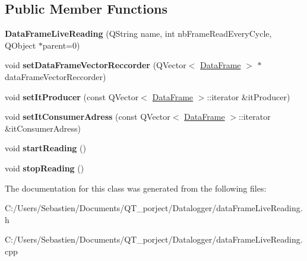 \subsection*{Public Member Functions}
\begin{DoxyCompactItemize}
\item 
\mbox{\label{class_data_frame_live_reading_a664559fc3ce08383f1d2ee146768c6a1}} 
{\bfseries Data\+Frame\+Live\+Reading} (Q\+String name, int nb\+Frame\+Read\+Every\+Cycle, Q\+Object $\ast$parent=0)
\item 
\mbox{\label{class_data_frame_live_reading_aa7281e272524ebcdd7e213eec07d8e0f}} 
void {\bfseries set\+Data\+Frame\+Vector\+Reccorder} (Q\+Vector$<$ \hyperlink{class_data_frame}{Data\+Frame} $>$ $\ast$data\+Frame\+Vector\+Reccorder)
\item 
\mbox{\label{class_data_frame_live_reading_aba95df4ecd500fcc17122e1a45c3ac50}} 
void {\bfseries set\+It\+Producer} (const Q\+Vector$<$ \hyperlink{class_data_frame}{Data\+Frame} $>$\+::iterator \&it\+Producer)
\item 
\mbox{\label{class_data_frame_live_reading_ae0a30ff795ed51644fc04acc5133762e}} 
void {\bfseries set\+It\+Consumer\+Adress} (const Q\+Vector$<$ \hyperlink{class_data_frame}{Data\+Frame} $>$\+::iterator \&it\+Consumer\+Adress)
\item 
\mbox{\label{class_data_frame_live_reading_a5536ffbdbce5f234914ae58be7cbcb53}} 
void {\bfseries start\+Reading} ()
\item 
\mbox{\label{class_data_frame_live_reading_ad81c79f8783f7343a2450cbde6dc6d1f}} 
void {\bfseries stop\+Reading} ()
\end{DoxyCompactItemize}


The documentation for this class was generated from the following files\+:\begin{DoxyCompactItemize}
\item 
C\+:/\+Users/\+Sebastien/\+Documents/\+Q\+T\+\_\+porject/\+Datalogger/data\+Frame\+Live\+Reading.\+h\item 
C\+:/\+Users/\+Sebastien/\+Documents/\+Q\+T\+\_\+porject/\+Datalogger/data\+Frame\+Live\+Reading.\+cpp\end{DoxyCompactItemize}
